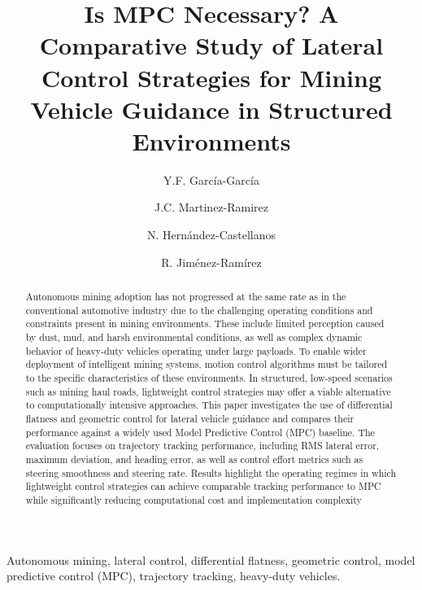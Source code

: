 \documentclass[letterpaper]{ifacconf}
\begin{document}
\begin{frontmatter}

\title{Is MPC Necessary? A Comparative Study of Lateral Control Strategies for Mining Vehicle Guidance in Structured Environments}

\author[First]{Y.F. García-García}
\author[Second]{J.C. Martinez-Ramirez}
\author[Third]{N. Hernández-Castellanos}
\author[Fourth]{R. Jiménez-Ramírez}

\address[First]{Universidad Tecnologica de la Mixteca (e-mail: yahoff.gg@gmail.com)}
\address[Second]{Caterpillar Inc. (e-mail: julio.martinez1@cat.com)}
\address[Third]{Universidad Tecnologica de la Mixteca (e-mail: nestihc22@hotmail.com)}
\address[Fourth]{Universidad Tecnologica de la Mixteca (e-mail: rljimenezrz@gmail.com)}

\begin{abstract}
Autonomous mining adoption has not progressed at the same rate as in the
conventional automotive industry due to the challenging operating conditions and constraints
present in mining environments. These include limited perception caused by dust, mud, and
harsh environmental conditions, as well as complex dynamic behavior of heavy-duty vehicles
operating under large payloads. To enable wider deployment of intelligent mining systems,
motion control algorithms must be tailored to the specific characteristics of these environments.
In structured, low-speed scenarios such as mining haul roads, lightweight control strategies may
offer a viable alternative to computationally intensive approaches. This paper investigates the
use of differential flatness and geometric control for lateral vehicle guidance and compares their
performance against a widely used Model Predictive Control (MPC) baseline. The evaluation
focuses on trajectory tracking performance, including RMS lateral error, maximum deviation,
and heading error, as well as control effort metrics such as steering smoothness and steering
rate. 
Results highlight the operating regimes in which lightweight control strategies can achieve
comparable tracking performance to MPC while significantly reducing computational cost and
implementation complexity
\end{abstract}

\begin{keyword}
Autonomous mining, lateral control, differential flatness, geometric control, model predictive control (MPC), trajectory tracking, heavy-duty vehicles.
\end{keyword}

\end{frontmatter}
\end{document}
